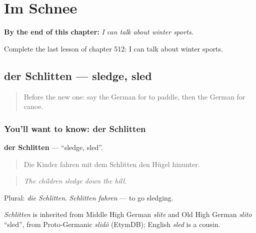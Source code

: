 
\chapter{Im Schnee}
\label{ch:ge-im-schnee}

\begin{chapteropening}
\textbf{By the end of this chapter:} \emph{I can talk about winter sports.}

Complete the last lesson of chapter 512: I can talk about winter sports.
\end{chapteropening}

\section[der Schlitten]{der Schlitten — sledge, sled}

\label{lesson:GE-C512-schlitten}



\begin{quote}
Before the new one: say the German for to paddle, then the German for canoe.
\end{quote}

\subsection*{You'll want to know: der Schlitten}
\textbf{der Schlitten} — \textquotedblleft{}sledge, sled\textquotedblright{}.

\begin{quote}
Die Kinder fahren mit dem Schlitten den Hügel hinunter.
\end{quote}

\begin{quote}
\emph{The children sledge down the hill.}
\end{quote}

Plural: \emph{die Schlitten}. \emph{Schlitten fahren} — to go sledging.

\begin{cousinweb}
\emph{Schlitten} is inherited from Middle High German \emph{slite} and Old High German \emph{slito} \textquotedblleft{}sled\textquotedblright{}, from Proto-Germanic \emph{slidô} (EtymDB); English \emph{sled} is a cousin.
\end{cousinweb}

